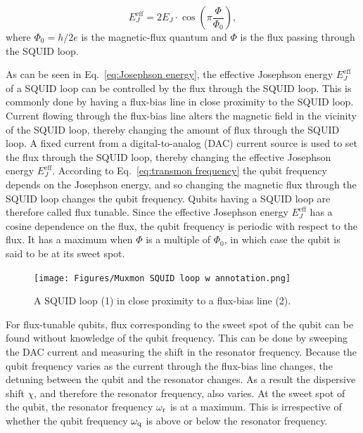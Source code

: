         \begin{equation}
          E_J^\text{eff}=2E_J \cdot \cos{\left( \pi \frac{\Phi}{\Phi_0} \right)},
          \label{eq:Josephson energy}
        \end{equation}
        where $\Phi_0=h/2e$ is the magnetic-flux quantum and $\Phi$ is the flux passing through the SQUID loop.

        As can be seen in Eq.~\ref{eq:Josephson energy}, the effective Josephson energy $E_J^\text{eff}$ of a SQUID loop can be controlled by the flux through the SQUID loop. This is commonly done by having a flux-bias line in close proximity to the SQUID loop. Current flowing through the flux-bias line alters the magnetic field in the vicinity of the SQUID loop, thereby changing the amount of flux through the SQUID loop. A fixed current from a digital-to-analog (DAC) current source is used to set the flux through the SQUID loop, thereby changing the effective Josephson energy $E_J^\text{eff}$. According to Eq.~\ref{eq:transmon frequency} the qubit frequency depends on the Josephson energy, and so changing the magnetic flux through the SQUID loop changes the qubit frequency. Qubits having a SQUID loop are therefore called flux tunable. Since the effective Josephson energy $E_J^\text{eff}$ has a cosine dependence on the flux, the qubit frequency is periodic with respect to the flux. It has a maximum when $\Phi$ is a multiple of $\Phi_0$, in which case the qubit is said to be at its sweet spot.

        \begin{figure}
          \begin{center}
          \vspace{-30pt}
            \texttt{[image: Figures/Muxmon SQUID loop w annotation.png]}
          \end{center}
          \vspace{-20 pt}
          \caption{A SQUID loop (1) in close proximity to a flux-bias line (2).}
          \label{fig:SQUID loop}
        \end{figure}
        For flux-tunable qubits, flux corresponding to the sweet spot of the qubit can be found without knowledge of the qubit frequency. This can be done by sweeping the DAC current and measuring the shift in the resonator frequency. Because the qubit frequency varies as the current through the flux-bias line changes, the detuning between the qubit and the resonator changes. As a result the dispersive shift $\chi$, and therefore the resonator frequency, also varies. At the sweet spot of the qubit, the resonator frequency $\omega_\text{r}$ is at a maximum. This is irrespective of whether the qubit frequency $\omega_\text{q}$ is above or below the resonator frequency.

